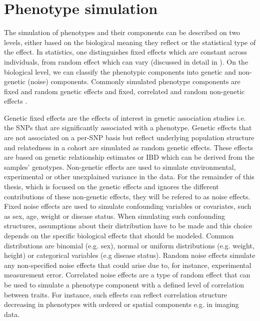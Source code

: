 \section{Phenotype simulation}
\label{section:phenotype-simulation}
The simulation of phenotypes and their components can be described on two levels, either based on the biological meaning they reflect or the statistical type of the effect. In statistics, one distinguishes fixed effects which are constant across individuals, from random effect which can vary (discussed in detail in \citep{Gelman2005}). On the biological level, we can classify the phenotypic components into genetic and non-genetic (noise) components.
Commonly simulated phenotype components are fixed and random genetic effects and fixed, correlated and random non-genetic effects \citep{Stephens2013,Marigorta2014,Zhou2014,Loh2014}. 

Genetic fixed effects are the effects of interest in genetic association studies i.e. the SNPs that are significantly associated with a phenotype. Genetic effects that are not associated on a per-SNP basis but reflect underlying population structure and relatedness in a cohort are simulated as random genetic effects. These effects are based on genetic relationship estimates or IBD which can be derived from the samples' genotypes. Non-genetic effects are used to simulate environmental, experimental or other unexplained variance in the data. For the remainder of this thesis, which is focused on the genetic effects and ignores the different contributions of these non-genetic effects, they will be refered to as noise effects. Fixed noise effects are used to simulate confounding variables or covariates, such as sex, age, weight or disease status. When simulating such confounding structures, assumptions about their distribution have to be made and this choice depends on the specific biological effects that should be modeled. Common distributions are binomial (e.g. sex), normal or uniform distributions (e.g. weight, height) or categorical variables (e.g disease status). Random noise effects simulate any non-specified noise effects that could arise due to, for instance, experimental measurement error.  Correlated noise effects are a type of random effect that can be used to simulate a phenotype component with a defined level of correlation between traits. For instance, such effects can reflect correlation structure decreasing in phenotypes with ordered or spatial components e.g. in imaging data. 

